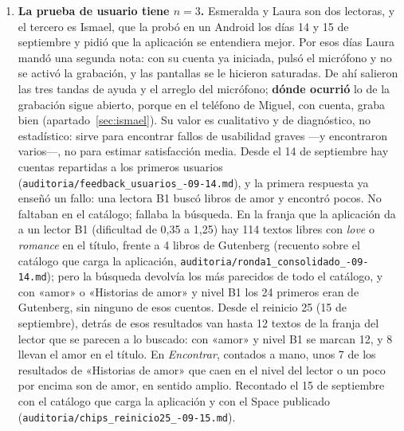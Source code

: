 \documentclass[11pt,a4paper]{article}
\newcommand{\cod}[1]{\texttt{\small #1}}
\begin{document}
\begin{enumerate}[leftmargin=*, itemsep=4pt]
        sobre el Space sin el buscador precargado, dio 31 s hasta \cod{RUNNING} y 32 s
        hasta que la página respondía. Todas son cotas inferiores: despertar de una
        suspensión de 48 h añade traer la imagen. El disco del
        contenedor \textbf{sí es efímero}, y por eso la estantería, el avance de
        lectura, el cuaderno y el perfil del lector ---o de su cuenta--- se guardan en un \textbf{bucket de
        almacenamiento montado en \cod{/data}} (18 USD por TB y mes en repositorio
        privado, y esto ocupa megas). Verificado de punta a punta: se fijó un perfil,
        se reinició el Space y el perfil seguía ahí. Era la acción A4 de la estrategia
        y está cerrada.
  \item \textbf{La prueba de usuario tiene $n = 3$.} Esmeralda y Laura son dos lectoras,
        y el tercero es Ismael, que la probó en un Android los días 14 y 15 de septiembre y
        pidió que la aplicación se entendiera mejor. Por esos días Laura mandó una segunda
        nota: con su cuenta ya iniciada, pulsó el micrófono y no se activó la grabación, y
        las pantallas se le hicieron saturadas. De ahí salieron las tres tandas de ayuda y
        el arreglo del micrófono; \textbf{dónde ocurrió} lo de la grabación sigue abierto,
        porque en el teléfono de Miguel, con cuenta, graba bien
        (apartado~\ref{sec:ismael}).
        Su valor es cualitativo y de diagnóstico, no estadístico: sirve para encontrar
        fallos de usabilidad graves —y encontraron varios—, no para estimar satisfacción
        media. Desde el 14 de septiembre hay cuentas repartidas a los primeros usuarios (\cod{auditoria/\allowbreak feedback\_usuarios\_-09-14.md}), y la primera respuesta ya enseñó un fallo: una lectora B1 buscó libros de amor y encontró pocos. No faltaban en el catálogo; fallaba la búsqueda. En la franja que la aplicación da a un lector B1 (dificultad de 0,35 a 1,25) hay 114 textos libres con \emph{love} o \emph{romance} en el título, frente a 4 libros de Gutenberg (recuento sobre el catálogo que carga la aplicación, \cod{auditoria/\allowbreak ronda1\_consolidado\_-09-14.md}); pero la búsqueda devolvía los más parecidos de todo el catálogo, y con «amor» o «Historias de amor» y nivel B1 los 24 primeros eran de Gutenberg, sin ninguno de esos cuentos. Desde el reinicio 25 (15 de septiembre), detrás de esos resultados van hasta 12 textos de la franja del lector que se parecen a lo buscado: con «amor» y nivel B1 se marcan 12, y 8 llevan el amor en el título. En \emph{Encontrar}, contados a mano, unos 7 de los resultados de «Historias de amor» que caen en el nivel del lector o un poco por encima son de amor, en sentido amplio. Recontado el 15 de septiembre con el catálogo que carga la aplicación y con el Space publicado (\cod{auditoria/\allowbreak chips\_reinicio25\_-09-15.md}).

\end{enumerate}
\end{document}
